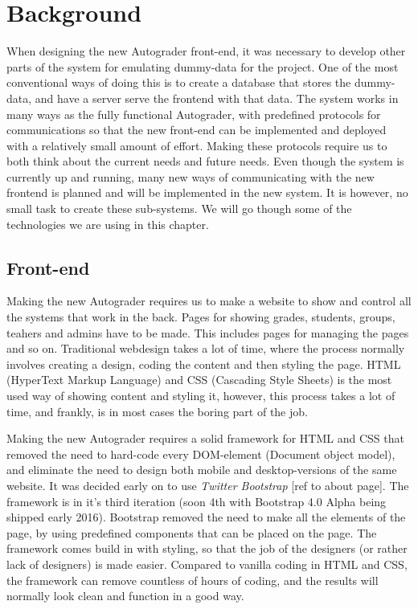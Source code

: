 \chapter{Background}

When designing the new Autograder front-end, it was necessary to develop other parts of the system for emulating dummy-data for the project. One of the most conventional ways of doing this is to create a database that stores the dummy-data, and have a server serve the frontend with that data. The system works in many ways as the fully functional Autograder, with predefined protocols for communications so that the new front-end can be implemented and deployed with a relatively small amount of effort. Making these protocols require us to both think about the current needs and future needs. Even though the system is currently up and running, many new ways of communicating with the new frontend is planned and will be implemented in the new system. It is however, no small task to create these sub-systems. We will go though some of the technologies we are using in this chapter.

\section{Front-end}
Making the new Autograder requires us to make a website to show and control all the systems that work in the back. Pages for showing grades, students, groups, teahers and admins have to be made. This includes pages for managing the pages and so on. Traditional webdesign takes a lot of time, where the process normally involves creating a design, coding the content and then styling the page. HTML (HyperText Markup Language) and CSS (Cascading Style Sheets) is the most used way of showing content and styling it, however, this process takes a lot of time, and frankly, is in most cases the boring part of the job.

Making the new Autograder requires a solid framework for HTML and CSS that removed the need to hard-code every DOM-element (Document object model), and eliminate the need to design both mobile and desktop-versions of the same website. It was decided early on to use \textit{Twitter Bootstrap} [ref to about page]. The framework is in it's third iteration (soon 4th with Bootstrap 4.0 Alpha being shipped early 2016). Bootstrap removed the need to make all the elements of the page, by using predefined components that can be placed on the page. The framework comes build in with styling, so that the job of the designers (or rather lack of designers) is made easier. Compared to vanilla coding in HTML and CSS, the framework can remove countless of hours of coding, and the results will normally look clean and function in a good way.


